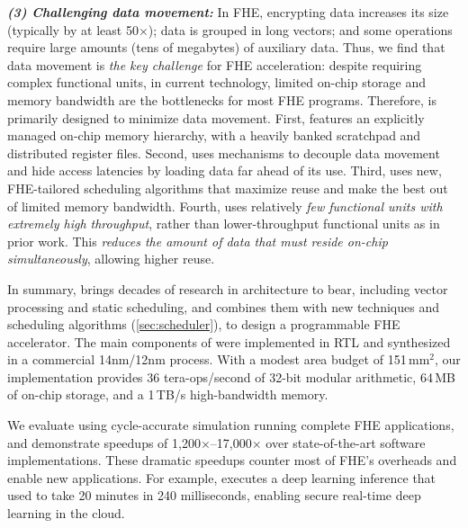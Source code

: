 \noindent \textbf{\emph{(3) Challenging data movement:}}
In FHE, encrypting data increases its size (typically by at least 50$\times$);
data is grouped in long vectors; and some operations require large amounts (tens of megabytes) of auxiliary data.
Thus, we find that data movement is \emph{the key challenge} for FHE acceleration:
despite requiring complex functional units, in current technology, limited on-chip storage and memory bandwidth are the bottlenecks for most FHE programs.
%
Therefore, \name is primarily designed to minimize data movement.
First, \name features an explicitly managed on-chip memory hierarchy,
with a heavily banked scratchpad and distributed register files.
Second, \name uses mechanisms to decouple data movement and hide access latencies by loading data far ahead of its use.
Third, \name uses new, FHE-tailored scheduling algorithms that maximize reuse and make the best out of limited memory bandwidth.
Fourth, \name uses relatively \emph{few functional units with extremely high throughput}, rather than lower-throughput functional units as in prior work.
This \emph{reduces the amount of data that must reside on-chip simultaneously}, allowing higher reuse.

In summary, \name brings decades of research in architecture to bear, including vector processing and static scheduling, and combines them with new techniques and scheduling algorithms (\autoref{sec:scheduler}), to design a programmable FHE accelerator.
The main components of \name were implemented in RTL and synthesized in a commercial 14nm/12nm process.
With a modest area budget of 151\,mm$^2$, our \name implementation 
provides 36 tera-ops/second of 32-bit modular arithmetic, 64\,MB of on-chip storage, and a 1\,TB/s high-bandwidth memory.

We evaluate \name using cycle-accurate simulation running complete FHE applications,
and demonstrate speedups of 1,200$\times$--17,000$\times$ over state-of-the-art software implementations.
These dramatic speedups counter most of FHE's overheads and enable new applications.
For example, \name executes a deep learning inference that used to take 20 minutes in 240 milliseconds,
enabling secure real-time deep learning in the cloud.


